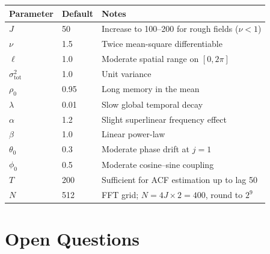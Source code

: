\documentclass[12pt]{article}
\begin{document}
\begin{center}
\begin{tabular}{@{}lll@{}}
\toprule
\textbf{Parameter} & \textbf{Default} & \textbf{Notes} \\
\midrule
$J$                 & 50       & Increase to 100--200 for rough fields ($\nu < 1$) \\
$\nu$               & 1.5      & Twice mean-square differentiable \\
$\ell$              & 1.0      & Moderate spatial range on $[0,2\pi]$ \\
$\sigma^2_\mathrm{tot}$ & 1.0 & Unit variance \\
$\rho_0$            & 0.95     & Long memory in the mean \\
$\lambda$           & 0.01     & Slow global temporal decay \\
$\alpha$            & 1.2      & Slight superlinear frequency effect \\
$\beta$             & 1.0      & Linear power-law \\
$\theta_0$          & 0.3      & Moderate phase drift at $j=1$ \\
$\phi_0$            & 0.5      & Moderate cosine--sine coupling \\
$T$                 & 200      & Sufficient for ACF estimation up to lag 50 \\
$N$                 & 512      & FFT grid; $N = 4J \times 2 = 400$, round to $2^9$ \\
\bottomrule
\end{tabular}
\end{center}

\section{Open Questions}
\end{document}
